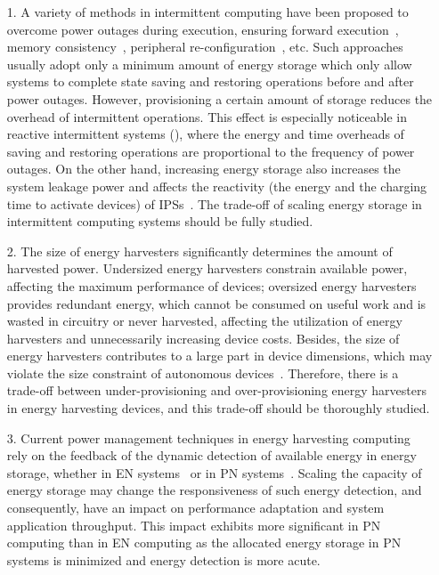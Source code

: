 \begin{itemize}
  \item [1.] A variety of methods in intermittent computing have been proposed to overcome power outages during execution, ensuring forward execution~\cite{ransford2012mementos}, memory consistency~\cite{lucia2015simpler}, peripheral re-configuration~\cite{liu2019130}, etc. 
  Such approaches usually adopt only a minimum amount of energy storage which only allow systems to complete state saving and restoring operations before and after power outages. 
  However, provisioning a certain amount of storage reduces the overhead of intermittent operations. 
  This effect is especially noticeable in reactive intermittent systems (), where the energy and time overheads of saving and restoring operations are proportional to the frequency of power outages. 
  On the other hand, increasing energy storage also increases the system leakage power and affects the reactivity (the energy and the charging time to activate devices) of IPSs~\cite{colin2018reconfigurable, wu2018extensible}. 
  The trade-off of scaling energy storage in intermittent computing systems should be fully studied. 
  \item [2.] The size of energy harvesters significantly determines the amount of harvested power. 
  Undersized energy harvesters constrain available power, affecting the maximum performance of devices; oversized energy harvesters provides redundant energy, which cannot be consumed on useful work and is wasted in circuitry or never harvested, affecting the utilization of energy harvesters and unnecessarily increasing device costs. 
  Besides, the size of energy harvesters contributes to a large part in device dimensions, which may violate the size constraint of autonomous devices~\cite{buchli2014dynamic}. 
  Therefore, there is a trade-off between under-provisioning and over-provisioning energy harvesters in energy harvesting devices, and this trade-off should be thoroughly studied. 
  \item [3.] Current power management techniques in energy harvesting computing rely on the feedback of the dynamic detection of available energy in energy storage, whether in EN systems~\cite{kansal2007power, wagemann2018operating} or in PN systems~\cite{balsamo2016graceful, fletcher2017power}. 
  Scaling the capacity of energy storage may change the responsiveness of such energy detection, and consequently, have an impact on performance adaptation and system application throughput. 
  This impact exhibits more significant in PN computing than in EN computing as the allocated energy storage in PN systems is minimized and energy detection is more acute. 
\end{itemize}


